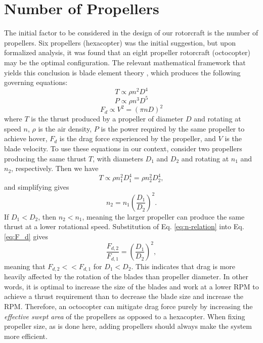 \documentclass{article}
\begin{document}
\section{Number of Propellers}\label{sec:num_props}
The initial factor to be considered in the design of our rotorcraft is the number of propellers. Six propellers (hexacopter) was the initial suggestion, but upon formalized analysis, it was found that an eight propeller rotorcraft (octocopter) may be the optimal configuration. The relevant mathematical framework that yields this conclusion is blade element theory \cite{GUDMUNDSSON2014581}, which produces the following governing equations:
\begin{equation}
    T \propto \rho n^2 D^4
\end{equation}
\begin{equation}\label{eq:P}
    P \propto \rho n^3 D^5
\end{equation}
\begin{equation}\label{eq:F_d}
    F_d \propto V^2 = (\pi nD)^2
\end{equation}
where $T$ is the thrust produced by a propeller of diameter $D$ and rotating at speed $n$, $\rho$ is the air density, $P$ is the power required by the same propeller to achieve hover, $F_d$ is the drag force experienced by the propeller, and $V$ is the blade velocity. To use these equations in our context, consider two propellers producing the same thrust $T$, with diameters $D_1$ and $D_2$ and rotating at $n_1$ and $n_2$, respectively. Then we have
\begin{equation}
    T \propto \rho n_1^2 D_1^4 = \rho n_2^2 D_2^4,
\end{equation}
and simplifying gives
\begin{equation}\label{eq:n-relation}
    n_2 = n_1(\frac{D_1}{D_2})^2.
\end{equation}
If $D_1 < D_2$, then $n_2 < n_1$, meaning the larger propeller can produce the same thrust at a lower rotational speed. Substitution of Eq. \ref{eq:n-relation} into Eq. \ref{eq:F_d} gives
\begin{equation}
    \frac{F_{d,2}}{F_{d,1}} = (\frac{D_1}{D_2})^2,
\end{equation}
meaning that $F_{d,2} << F_{d,1}$ for $D_1 < D_2$. This indicates that drag is more heavily affected by the rotation of the blades than propeller diameter. In other words, it is optimal to increase the size of the blades and work at a lower RPM to achieve a thrust requirement than to decrease the blade size and increase the RPM. Therefore, an octocopter can mitigate drag force purely by increasing the \textit{effective swept area} of the propellers as opposed to a hexacopter. When fixing propeller size, as is done here, adding propellers should always make the system more efficient.
\end{document}
